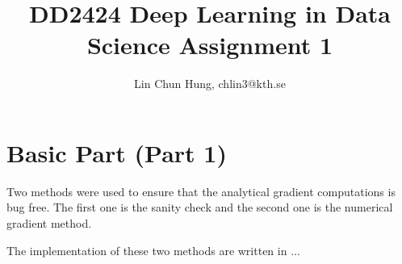 \documentclass[12pt]{article}
\newenvironment{question}[2][Question]{\begin{trivlist}
\kern10pt
\item[\hskip \labelsep {\bfseries #1}\hskip \labelsep {\bfseries #2.}]}{\end{trivlist}}
\begin{document}
\title{DD2424 Deep Learning in Data Science Assignment 1}
\author{Lin Chun Hung, chlin3@kth.se}

\maketitle

\section{Basic Part (Part 1)}
\begin{question}{2.i}
Two methods were used to ensure that the analytical gradient computations is bug
free. The first one is the sanity check and the second one is the numerical gradient method.

The implementation of these two methods are written in ...



\end{question}
\end{document}

